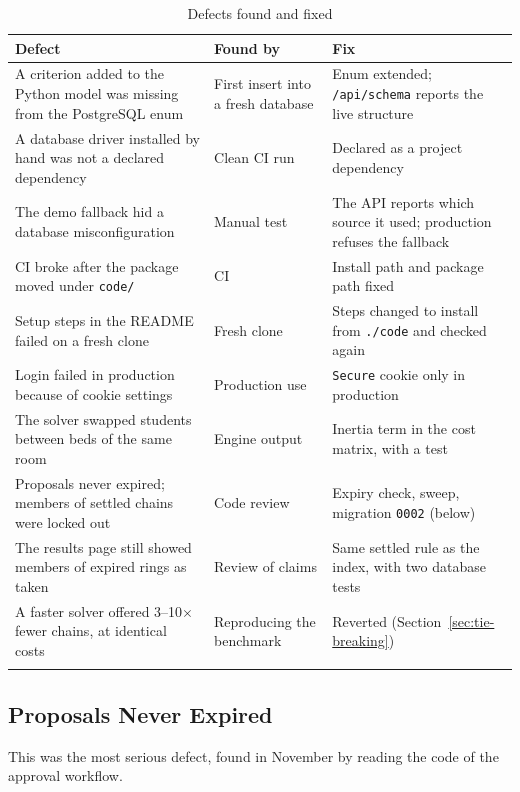 \begin{longtable}{>{\raggedright\arraybackslash}p{} >{\raggedright\arraybackslash}p{} >{\raggedright\arraybackslash}p{}}
\toprule
\textbf{Defect} & \textbf{Found by} & \textbf{Fix} \\
\midrule
\endhead
A criterion added to the Python model was missing from the PostgreSQL enum & First insert into a fresh database & Enum extended; \texttt{/api/schema} reports the live structure \\
A database driver installed by hand was not a declared dependency & Clean CI run & Declared as a project dependency \\
The demo fallback hid a database misconfiguration & Manual test & The API reports which source it used; production refuses the fallback \\
CI broke after the package moved under \texttt{code/} & CI & Install path and package path fixed \\
Setup steps in the README failed on a fresh clone & Fresh clone & Steps changed to install from \texttt{./code} and checked again \\
Login failed in production because of cookie settings & Production use & \texttt{Secure} cookie only in production \\
The solver swapped students between beds of the same room & Engine output & Inertia term in the cost matrix, with a test \\
Proposals never expired; members of settled chains were locked out & Code review & Expiry check, sweep, migration \texttt{0002} (below) \\
The results page still showed members of expired rings as taken & Review of claims & Same settled rule as the index, with two database tests \\
A faster solver offered 3--10$\times$ fewer chains, at identical costs & Reproducing the benchmark & Reverted (Section~\ref{sec:tie-breaking}) \\
\bottomrule
\caption{Defects found and fixed}
\label{tab:defects}
\end{longtable}

\subsection{Proposals Never Expired}
\label{sec:expiry-defect}

This was the most serious defect, found in November by reading the code
of the approval workflow.

